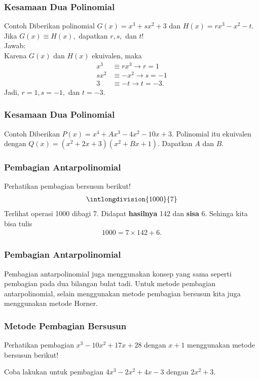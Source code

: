 \documentclass[11pt]{beamer}
\begin{document}
	\begin{frame}
		\frametitle{Kesamaan Dua Polinomial}
		\begin{exampleblock}{Contoh}
			Diberikan polinomial $G(x)=x^3+sx^2+3$ dan $H(x)=rx^3-x^2-t$. Jika $G(x)\equiv H(x),$ dapatkan $r, s,$ dan $t$!\\
			
			Jawab:\\
			Karena $G(x)$ dan $H(x)$ ekuivalen, maka
			\begin{align*}
				x^3&\equiv rx^3\rightarrow r=1\\ sx^2&\equiv-x^2 \rightarrow s=-1 \\3&\equiv-t \rightarrow t=-3.
			\end{align*}
			Jadi, $r=1, s=-1,$ dan $t=-3.$
		\end{exampleblock}
	\end{frame}
		
	\begin{frame}
		\frametitle{Kesamaan Dua Polinomial}
		
		\begin{exampleblock}{Contoh}
			Diberikan $P(x)=x^4+Ax^3-4x^2-10x+3$. Polinomial itu ekuivalen dengan $Q(x)=(x^2+2x+3)(x^2+Bx+1)$. Dapatkan $A$ dan $B$.
		\end{exampleblock}
		
	\end{frame}

	\begin{frame}
		\frametitle{Pembagian Antarpolinomial}
		Perhatikan pembagian bersusun berikut!
		\begin{align*}
			\intlongdivision{1000}{7}	
		\end{align*}
		Terlihat operasi 1000 dibagi 7. Didapat \textbf{hasilnya} 142 dan \textbf{sisa} 6. Sehinga kita bisa tulis
		\begin{align*}
			1000 = 7\times142+6.
		\end{align*} 
		
	\end{frame}
	
	\begin{frame}
		\frametitle{Pembagian Antarpolinomial}
		Pembagian antarpolinomial juga menggunakan konsep yang sama seperti pembagian pada dua bilangan bulat tadi. Untuk metode pembagian antarpolinomial, selain menggunakan metode pembagian bersusun kita juga menggunakan metode Horner.
	\end{frame}	
	
	\begin{frame}
		\frametitle{Metode Pembagian Bersusun}
		Perhatikan pembagian $x^3-10x^2+17x+28$ dengan $x+1$ menggunakan metode bersusun berikut!
		\begin{center}
			\polylongdiv[style=A]{x^3-10x^2+17x+28}{x+1}
		\end{center}
		Coba lakukan untuk pembagian $4x^3-2x^2+4x-3$ dengan $2x^2+3$.
	\end{frame}
	
\end{document}
